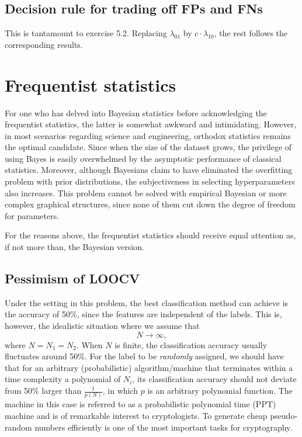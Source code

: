 \documentclass[UTF8]{ctexart}
\begin{document}
\subsection{Decision rule for trading off FPs and FNs}
This is tantamount to exercise 5.2.
Replacing $\lambda_{01}$ by $c\cdot \lambda_{10}$, the rest follows the corresponding results.


\newpage
\section{Frequentist statistics}
For one who has delved into Bayesian statistics before acknowledging the frequentist statistics, the latter is somewhat awkward and intimidating.
However, in most scenarios regarding science and engineering, orthodox statistics remains the optimal candidate.
Since when the size of the dataset grows, the privilege of using Bayes is easily overwhelmed by the asymptotic performance of classical statistics.
Moreover, although Bayesians claim to have eliminated the overfitting problem with prior distributions, the subjectiveness in selecting hyperparameters also increases.
This problem cannot be solved with empirical Bayesian or more complex graphical structures, since none of them cut down the degree of freedom for parameters.

For the reasons above, the frequentist statistics should receive equal attention as, if not more than, the Bayesian version.

\subsection{Pessimism of LOOCV}
Under the setting in this problem, the best classification method can achieve is the accuracy of 50\%, since the features are independent of the labels.
This is, however, the idealistic situation where we assume that $$N\rightarrow \infty,$$
where $N=N_{1}=N_{2}$.
When $N$ is finite, the classification accuracy usually fluctuates around 50\%.
For the label to be \emph{randomly} assigned, we should have that for an arbitrary (probabilistic) algorithm/machine that terminates within a time complexity a polynomial of $N_{i}$, its classification accuracy should not deviate from 50\% larger than $\frac{1}{p(N)}$, in which $p$ is an arbitrary polynomial function.
The machine in this case is referred to as a probabilistic polynomial time (PPT) machine and is of remarkable interest to cryptologists.
To generate cheap pseudo-random numbers efficiently is one of the most important tasks for cryptography.
\end{document}
